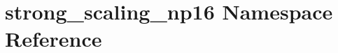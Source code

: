 \hypertarget{namespacestrong__scaling__np16}{}\section{strong\+\_\+scaling\+\_\+np16 Namespace Reference}
\label{namespacestrong__scaling__np16}
